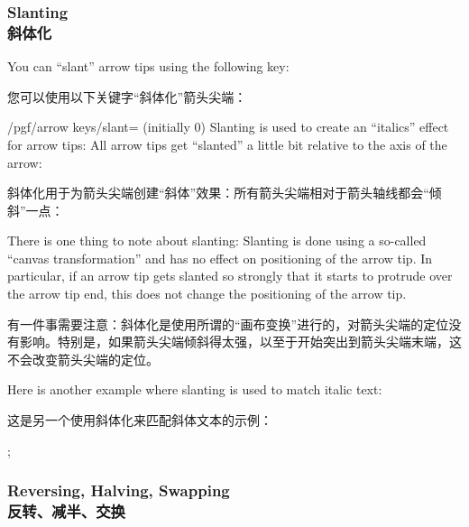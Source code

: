 \subsubsection{Slanting\\斜体化}

You can ``slant'' arrow tips using the following key:

您可以使用以下关键字“斜体化”箭头尖端：

\begin{key}{/pgf/arrow keys/slant= (initially 0)}
    Slanting is used to create an ``italics'' effect for arrow tips: All arrow
    tips get ``slanted'' a little bit relative to the axis of the arrow:
    
    斜体化用于为箭头尖端创建“斜体”效果：所有箭头尖端相对于箭头轴线都会“倾斜”一点：
\begin{codeexample}[preamble={\usetikzlibrary{arrows.meta}}]
\end{codeexample}
    There is one thing to note about slanting: Slanting is done using a
    so-called ``canvas transformation'' and has no effect on positioning of
    the arrow tip. In particular, if an arrow tip gets slanted so strongly that
    it starts to protrude over the arrow tip end, this does not change the
    positioning of the arrow tip.

    有一件事需要注意：斜体化是使用所谓的“画布变换”进行的，对箭头尖端的定位没有影响。特别是，如果箭头尖端倾斜得太强，以至于开始突出到箭头尖端末端，这不会改变箭头尖端的定位。

    Here is another example where slanting is used to match italic text:

    这是另一个使用斜体化来匹配斜体文本的示例：
\begin{codeexample}[preamble={\usetikzlibrary{arrows.meta,graphs}}]
\tikz [>={[slant=.3] To[] To[]}]
  ;
\end{codeexample}
\end{key}


\subsubsection{Reversing, Halving, Swapping\\反转、减半、交换}
\label{section-arrow-key-harpoon}

